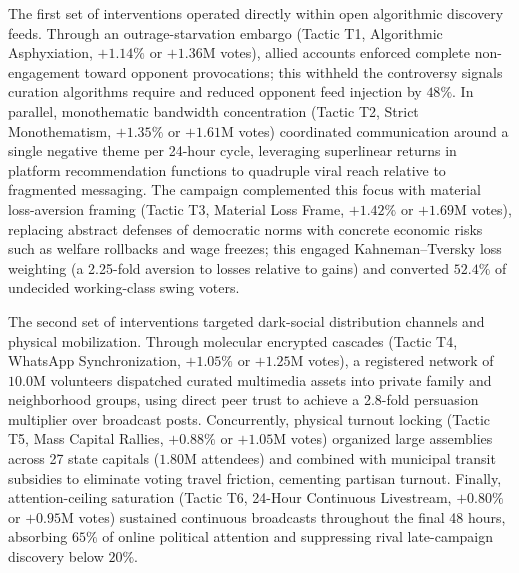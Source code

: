 \documentclass[a4paper,fleqn]{cas-dc}
\begin{document}
The first set of interventions operated directly within open algorithmic discovery feeds. Through an outrage-starvation embargo (Tactic T1, Algorithmic Asphyxiation, $+1.14\%$ or $+1.36\mathrm{M}$ votes), allied accounts enforced complete non-engagement toward opponent provocations; this withheld the controversy signals curation algorithms require and reduced opponent feed injection by $48\%$. In parallel, monothematic bandwidth concentration (Tactic T2, Strict Monothematism, $+1.35\%$ or $+1.61\mathrm{M}$ votes) coordinated communication around a single negative theme per 24-hour cycle, leveraging superlinear returns in platform recommendation functions to quadruple viral reach relative to fragmented messaging. The campaign complemented this focus with material loss-aversion framing (Tactic T3, Material Loss Frame, $+1.42\%$ or $+1.69\mathrm{M}$ votes), replacing abstract defenses of democratic norms with concrete economic risks such as welfare rollbacks and wage freezes; this engaged Kahneman--Tversky loss weighting (a 2.25-fold aversion to losses relative to gains) and converted $52.4\%$ of undecided working-class swing voters.

The second set of interventions targeted dark-social distribution channels and physical mobilization. Through molecular encrypted cascades (Tactic T4, WhatsApp Synchronization, $+1.05\%$ or $+1.25\mathrm{M}$ votes), a registered network of $10.0\mathrm{M}$ volunteers dispatched curated multimedia assets into private family and neighborhood groups, using direct peer trust to achieve a 2.8-fold persuasion multiplier over broadcast posts. Concurrently, physical turnout locking (Tactic T5, Mass Capital Rallies, $+0.88\%$ or $+1.05\mathrm{M}$ votes) organized large assemblies across 27 state capitals ($1.80\mathrm{M}$ attendees) and combined with municipal transit subsidies to eliminate voting travel friction, cementing partisan turnout. Finally, attention-ceiling saturation (Tactic T6, 24-Hour Continuous Livestream, $+0.80\%$ or $+0.95\mathrm{M}$ votes) sustained continuous broadcasts throughout the final 48 hours, absorbing $65\%$ of online political attention and suppressing rival late-campaign discovery below $20\%$.
\end{document}
